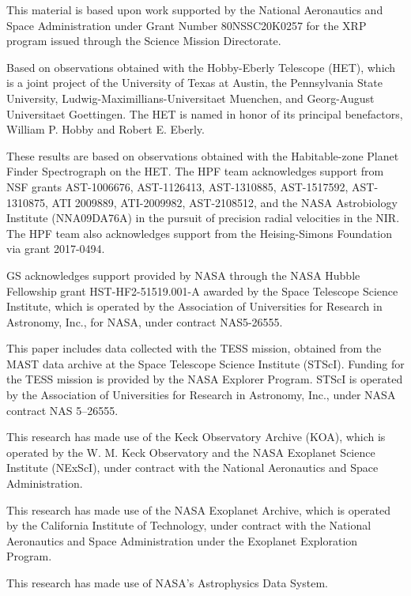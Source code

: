 \documentclass[twocolumn]{aastex631}
\begin{document}
\begin{acknowledgements}

    This material is based upon work supported by the National Aeronautics and Space Administration under Grant Number 80NSSC20K0257 for the XRP program issued through the Science Mission Directorate.

    Based on observations obtained with the Hobby-Eberly Telescope (HET), which is a joint project of the University of Texas at Austin, the Pennsylvania State University, Ludwig-Maximillians-Universitaet Muenchen, and Georg-August Universitaet Goettingen. The HET is named in honor of its principal benefactors, William P. Hobby and Robert E. Eberly.

    These results are based on observations obtained with the Habitable-zone Planet Finder Spectrograph on the HET. The HPF team acknowledges support from NSF grants AST-1006676, AST-1126413, AST-1310885, AST-1517592, AST-1310875, ATI 2009889, ATI-2009982, AST-2108512, and the NASA Astrobiology Institute (NNA09DA76A) in the pursuit of precision radial velocities in the NIR. The HPF team also acknowledges support from the Heising-Simons Foundation via grant 2017-0494.

    GS acknowledges support provided by NASA through the NASA Hubble Fellowship grant HST-HF2-51519.001-A awarded by the Space Telescope Science Institute, which is operated by the Association of Universities for Research in Astronomy, Inc., for NASA, under contract NAS5-26555.

    This paper includes data collected with the TESS mission, obtained from the MAST data archive at the Space Telescope Science Institute (STScI). Funding for the TESS mission is provided by the NASA Explorer Program. STScI is operated by the Association of Universities for Research in Astronomy, Inc., under NASA contract NAS 5–26555.

    This research has made use of the Keck Observatory Archive (KOA), which is operated by the W. M. Keck Observatory and the NASA Exoplanet Science Institute (NExScI), under contract with the National Aeronautics and Space Administration.

    This research has made use of the NASA Exoplanet Archive, which is operated by the California Institute of Technology, under contract with the National Aeronautics and Space Administration under the Exoplanet Exploration Program.

    This research has made use of NASA's Astrophysics Data System.
\end{acknowledgements}
\end{document}

